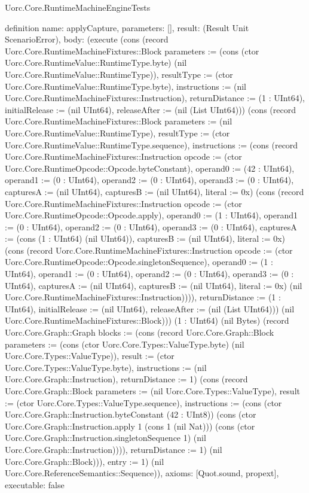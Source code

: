\begin{lexlean}{Uorc.Core.RuntimeMachineEngineTests}
\begin{semanticmodule}
definition{
  name: applyCapture,
  parameters: [],
  result: (Result Unit ScenarioError),
  body: (execute (cons (record Uorc.Core.RuntimeMachineFixtures::Block {parameters := (cons (ctor Uorc.Core.RuntimeValue::RuntimeType.byte) (nil Uorc.Core.RuntimeValue::RuntimeType)), resultType := (ctor Uorc.Core.RuntimeValue::RuntimeType.byte), instructions := (nil Uorc.Core.RuntimeMachineFixtures::Instruction), returnDistance := (1 : UInt64), initialRelease := (nil UInt64), releaseAfter := (nil (List UInt64))}) (cons (record Uorc.Core.RuntimeMachineFixtures::Block {parameters := (nil Uorc.Core.RuntimeValue::RuntimeType), resultType := (ctor Uorc.Core.RuntimeValue::RuntimeType.sequence), instructions := (cons (record Uorc.Core.RuntimeMachineFixtures::Instruction {opcode := (ctor Uorc.Core.RuntimeOpcode::Opcode.byteConstant), operand0 := (42 : UInt64), operand1 := (0 : UInt64), operand2 := (0 : UInt64), operand3 := (0 : UInt64), capturesA := (nil UInt64), capturesB := (nil UInt64), literal := 0x}) (cons (record Uorc.Core.RuntimeMachineFixtures::Instruction {opcode := (ctor Uorc.Core.RuntimeOpcode::Opcode.apply), operand0 := (1 : UInt64), operand1 := (0 : UInt64), operand2 := (0 : UInt64), operand3 := (0 : UInt64), capturesA := (cons (1 : UInt64) (nil UInt64)), capturesB := (nil UInt64), literal := 0x}) (cons (record Uorc.Core.RuntimeMachineFixtures::Instruction {opcode := (ctor Uorc.Core.RuntimeOpcode::Opcode.singletonSequence), operand0 := (1 : UInt64), operand1 := (0 : UInt64), operand2 := (0 : UInt64), operand3 := (0 : UInt64), capturesA := (nil UInt64), capturesB := (nil UInt64), literal := 0x}) (nil Uorc.Core.RuntimeMachineFixtures::Instruction)))), returnDistance := (1 : UInt64), initialRelease := (nil UInt64), releaseAfter := (nil (List UInt64))}) (nil Uorc.Core.RuntimeMachineFixtures::Block))) (1 : UInt64) (nil Bytes) (record Uorc.Core.Graph::Graph {blocks := (cons (record Uorc.Core.Graph::Block {parameters := (cons (ctor Uorc.Core.Types::ValueType.byte) (nil Uorc.Core.Types::ValueType)), result := (ctor Uorc.Core.Types::ValueType.byte), instructions := (nil Uorc.Core.Graph::Instruction), returnDistance := 1}) (cons (record Uorc.Core.Graph::Block {parameters := (nil Uorc.Core.Types::ValueType), result := (ctor Uorc.Core.Types::ValueType.sequence), instructions := (cons (ctor Uorc.Core.Graph::Instruction.byteConstant (42 : UInt8)) (cons (ctor Uorc.Core.Graph::Instruction.apply 1 (cons 1 (nil Nat))) (cons (ctor Uorc.Core.Graph::Instruction.singletonSequence 1) (nil Uorc.Core.Graph::Instruction)))), returnDistance := 1}) (nil Uorc.Core.Graph::Block))), entry := 1}) (nil Uorc.Core.ReferenceSemantics::Sequence)),
  axioms: [Quot.sound, propext],
  executable: false
}


\end{semanticmodule}
\end{lexlean}
